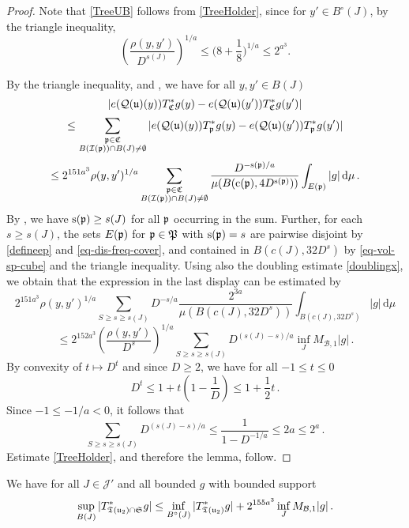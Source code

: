     \begin{proof}
        Note that \eqref{TreeUB} follows from \eqref{TreeHolder}, since for $y'\in B^\circ{}(J)$, by the triangle inequality,
        $$\left(\frac{\rho(y,y')}{D^{s(J)}}\right)^{1/a}\le \Big(8 + \frac{1}8\Big)^{1/a}\le 2^{a^3}.$$

        By the triangle inequality,  and , we have for all $y, y' \in B(J)$
        \begin{equation}
            \label{eq-C-Lip}
            |e({\mathcal{Q}}({\mathfrak u})(y)) T_{{\mathfrak C}}^* g(y) - e({\mathcal{Q}}({\mathfrak u})(y')) T_{{\mathfrak C}}^* g(y')|
        \end{equation}
        $$
            \leq \sum_{\substack{{\mathfrak p} \in {\mathfrak C}\\ B({\mathcal{I}}({\mathfrak p})) \cap B(J) \neq \emptyset}} |e({\mathcal{Q}}({\mathfrak u})(y)) T_{{\mathfrak p}}^* g(y) - e({\mathcal{Q}}({\mathfrak u})(y')) T_{{\mathfrak p}}^* g(y')|
        $$
        $$
            \le 2^{151a^3}\rho(y,y')^{1/a} \sum_{\substack{{\mathfrak p} \in {\mathfrak C}\\ B({\mathcal{I}}({\mathfrak p})) \cap B(J) \neq \emptyset}} \frac{D^{- {\mathrm{s}}({\mathfrak p})/a}}{\mu(B({\mathrm{c}}({\mathfrak p}), 4D^{{\mathrm{s}}({\mathfrak p})}))} \int_{E({\mathfrak p})} |g| \, \mathrm{d}\mu\,.
        $$
        By , we have ${\mathrm{s}}({\mathfrak p}) \ge s(J)$ for all ${\mathfrak p}$ occurring in the sum. Further, for each $s \ge s(J)$, the sets $E({\mathfrak p})$ for ${\mathfrak p} \in {\mathfrak P}$ with ${\mathrm{s}}({\mathfrak p}) = s$ are pairwise disjoint by \eqref{defineep} and \eqref{eq-dis-freq-cover}, and contained in $B(c(J), 32D^{s})$ by \eqref{eq-vol-sp-cube} and the triangle inequality. Using also the doubling estimate \eqref{doublingx}, we obtain that the expression in the last display can be estimated by
        $$
            2^{151a^3}\rho(y,y')^{1/a} \sum_{S \ge s \ge s(J)} D^{-s/a} \frac{2^{3a}}{\mu(B(c(J), 32D^{s}))} \int_{B(c(J), 32D^{s})} |g| \, \mathrm{d}\mu
        $$
        $$
            \le 2^{152a^3} \left(\frac{\rho(y,y')}{D^s}\right)^{1/a} \sum_{S \ge s \ge s(J)} D^{(s(J) - s)/a} \inf_J M_{\mathcal{B},1} |g|\,.
        $$
        By convexity of $t \mapsto D^t$ and since $D \ge 2$, we have for all $-1 \le t \le 0$
        $$
            D^t \le 1 + t(1 - \frac{1}{D}) \le 1 + \frac{1}{2}t\,.
        $$
        Since $-1 \le -1/a <0$, it follows that
        $$
            \sum_{S \ge s \ge s(J)} D^{(s(J) - s)/a} \le \frac{1}{1 - D^{-1/a}} \le 2a \le 2^a\,.
        $$
        Estimate \eqref{TreeHolder}, and therefore the lemma, follow.
    \end{proof}

    \begin{lemma}
        \label{global-tree-control-2}
        \leanok
        We have for all $J \in \mathcal{J}'$ and all bounded $g$ with bounded support
        $$
            \sup_{B(J)} |T^*_{{\mathfrak T}({\mathfrak u}_2) \cap \mathfrak{S}} g| \le \inf_{B^\circ{}(J)} |T^*_{{\mathfrak T}({\mathfrak u}_2)} g| + 2^{155a^3} \inf_{J} M_{\mathcal{B},1}|g|\,.
        $$
    \end{lemma}

